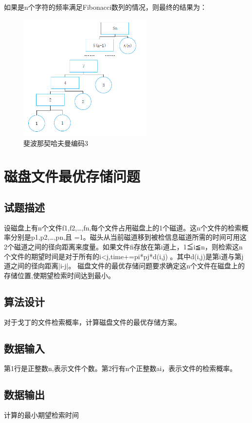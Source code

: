 \documentclass[UTF8]{ctexart}
\begin{document}
    如果是n个字符的频率满足Fibonacci数列的情况，则最终的结果为：

    \begin{figure}[!htb]
      \centering
      \includegraphics[width=0.6\textwidth]{../img/4.1.3.PNG}
      \caption{斐波那契哈夫曼编码3}\label{斐波那契哈夫曼编码3}
    \end{figure}

    \section{磁盘文件最优存储问题}
    \subsection{试题描述}
    设磁盘上有n个文件f1,f2,…,fn,每个文件占用磁盘上的1个磁道。这n个文件的检索概率分别是p1,p2,…,pn,且 =1。磁头从当前磁道移到被检信息磁道所需的时间可用这2个磁道之间的径向距离来度量。如果文件fi存放在第i道上，1≦i≦n，则检索这n个文件的期望时间是对于所有的i<j,time+=pi*pj*d(i,j) 。其中d(i,j)是第i道与第j道之间的径向距离|i-j|。
    磁盘文件的最优存储问题要求确定这n个文件在磁盘上的存储位置,使期望检索时间达到最小。
    \subsection{算法设计}
    对于戈丁的文件检索概率，计算磁盘文件的最优存储方案。
    \subsection{数据输入}
    第1行是正整数n,表示文件个数。第2行有n个正整数ai，表示文件的检索概率。
    \subsection{数据输出}
    计算的最小期望检索时间
\end{document}
